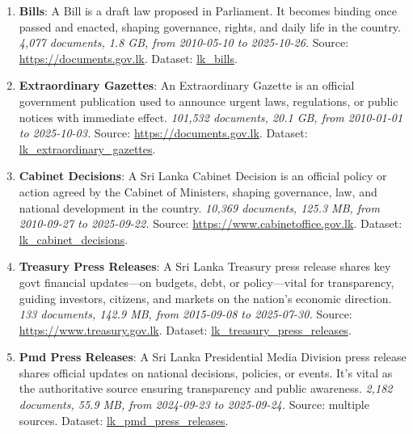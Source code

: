 \documentclass[10pt,a4paper]{article}%
\begin{document}
\begin{enumerate}
\item%
\textbf{Bills}: A Bill is a draft law proposed in Parliament. It becomes binding once passed and enacted, shaping governance, rights, and daily life in the country.\textit{ 4,077 documents, 1.8 GB, from 2010{-}05{-}10 to 2025{-}10{-}26.} Source: \href{https://documents.gov.lk}{https://documents.gov.lk}. Dataset: \href{https://github.com/nuuuwan/lk\_legal\_docs/tree/data\_lk\_bills/data/lk\_bills}{lk\_bills}.%
\item%
\textbf{Extraordinary Gazettes}: An Extraordinary Gazette is an official government publication used to announce urgent laws, regulations, or public notices with immediate effect.\textit{ 101,532 documents, 20.1 GB, from 2010{-}01{-}01 to 2025{-}10{-}03.} Source: \href{https://documents.gov.lk}{https://documents.gov.lk}. Dataset: \href{https://github.com/nuuuwan/lk\_legal\_docs/tree/data\_lk\_extraordinary\_gazettes/data/lk\_extraordinary\_gazettes}{lk\_extraordinary\_gazettes}.%
\item%
\textbf{Cabinet Decisions}: A Sri Lanka Cabinet Decision is an official policy or action agreed by the Cabinet of Ministers, shaping governance, law, and national development in the country.\textit{ 10,369 documents, 125.3 MB, from 2010{-}09{-}27 to 2025{-}09{-}22.} Source: \href{https://www.cabinetoffice.gov.lk}{https://www.cabinetoffice.gov.lk}. Dataset: \href{https://github.com/nuuuwan/lk\_cabinet\_decisions/tree/data/data/lk\_cabinet\_decisions}{lk\_cabinet\_decisions}.%
\item%
\textbf{Treasury Press Releases}: A Sri Lanka Treasury press release shares key govt financial updates—on budgets, debt, or policy—vital for transparency, guiding investors, citizens, and markets on the nation’s economic direction.\textit{ 133 documents, 142.9 MB, from 2015{-}09{-}08 to 2025{-}07{-}30.} Source: \href{https://www.treasury.gov.lk}{https://www.treasury.gov.lk}. Dataset: \href{https://github.com/nuuuwan/lk\_treasury/tree/data\_lk\_treasury\_press\_releases/data/lk\_treasury\_press\_releases}{lk\_treasury\_press\_releases}.%
\item%
\textbf{Pmd Press Releases}: A Sri Lanka Presidential Media Division press release shares official updates on national decisions, policies, or events. It’s vital as the authoritative source ensuring transparency and public awareness.\textit{ 2,182 documents, 55.9 MB, from 2024{-}09{-}23 to 2025{-}09{-}24.} Source: multiple sources. Dataset: \href{https://github.com/nuuuwan/lk\_pmd/tree/data\_lk\_pmd\_press\_releases/data/lk\_pmd\_press\_releases}{lk\_pmd\_press\_releases}.%

\end{enumerate}
\end{document}
